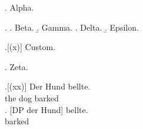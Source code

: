 

\ex. Alpha.

\ex.
\a. Beta.
\b. Gamma.
\a. Delta.
\b. Epsilon.

\ex.[(x)] Custom.

\ex. Zeta.

\exg.[(xx)] Der Hund bellte.\\
     the dog barked\\

\exg. [DP der Hund] bellte.\\
      [DP the  dog] barked\\

